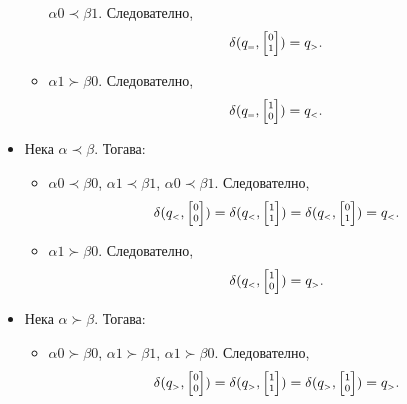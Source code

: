 \begin{extra}
\begin{hint}
\begin{itemize}
\begin{itemize}
      $\alpha 0 \prec \beta 1$. Следователно,
      \[\delta(q_{\scriptscriptstyle{=}},\scriptsize{\begin{bmatrix} 0\\1\end{bmatrix}}) = q_{\scriptscriptstyle{>}}.\]
    \item
      $\alpha 1 \succ \beta 0$. Следователно,
      \[\delta(q_{\scriptscriptstyle{=}},\scriptsize{\begin{bmatrix} 1\\0\end{bmatrix}}) = q_{\scriptscriptstyle{<}}.\]
    \end{itemize}
  \item 
    Нека $\alpha \prec \beta$. Тогава:
    \begin{itemize}
    \item 
      $\alpha 0 \prec \beta 0$, $\alpha 1 \prec \beta 1$, $\alpha 0 \prec \beta 1$. Следователно,
      \[\delta(q_{\scriptscriptstyle{<}},\scriptsize{\begin{bmatrix} 0\\0\end{bmatrix}}) = \delta(q_{\scriptscriptstyle{<}},\scriptsize{\begin{bmatrix} 1\\1\end{bmatrix}}) = \delta(q_{\scriptscriptstyle{<}},\scriptsize{\begin{bmatrix} 0\\1\end{bmatrix}}) = q_{\scriptscriptstyle{<}}.\]
    \item
      $\alpha 1 \succ \beta 0$. Следователно,
      \[\delta(q_{\scriptscriptstyle{<}},\scriptsize{\begin{bmatrix} 1\\0\end{bmatrix}}) = q_{\scriptscriptstyle{>}}.\]
    \end{itemize}
  \item
    Нека $\alpha \succ \beta$. Тогава:
    \begin{itemize}
    \item 
      $\alpha 0 \succ \beta 0$, $\alpha 1 \succ \beta 1$, $\alpha 1 \succ \beta 0$. Следователно,
      \[\delta(q_{\scriptscriptstyle{>}},\scriptsize{\begin{bmatrix} 0\\0\end{bmatrix}}) = \delta(q_{\scriptscriptstyle{>}},\scriptsize{\begin{bmatrix} 1\\1\end{bmatrix}}) = \delta(q_{\scriptscriptstyle{>}},\scriptsize{\begin{bmatrix} 1\\0\end{bmatrix}}) = q_{\scriptscriptstyle{>}}.\]

\end{itemize}
\end{itemize}
\end{hint}
\end{extra}
